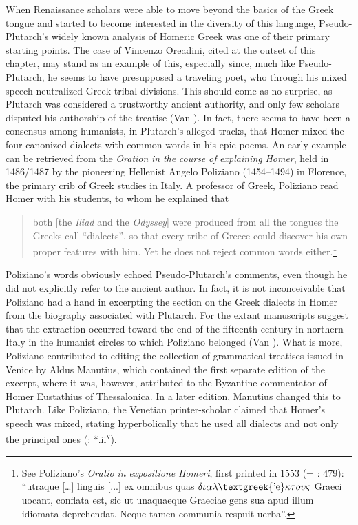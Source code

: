 \documentclass[output=paper]{langsci/langscibook}
\begin{document}
When Renaissance scholars were able to move beyond the basics of the Greek tongue and started to become interested in the diversity of this language, Pseudo-Plutarch’s widely known analysis of Homeric Greek was one of their primary starting points. The case of Vincenzo Oreadini, cited at the outset of this chapter, may stand as an example of this, especially since, much like Pseudo-Plutarch, he seems to have presupposed a traveling poet, who through his mixed speech neutralized Greek tribal divisions. This should come as no surprise, as Plutarch was considered a trustworthy ancient authority, and only few scholars disputed his authorship of the treatise (Van \citealt{Rooy2018c}). In fact, there seems to have been a consensus among humanists, in Plutarch’s alleged tracks, that Homer mixed the four canonized dialects with common words in his epic poems. An early example can be retrieved from the \textit{Oration} \textit{in} \textit{the} \textit{course} \textit{of} \textit{explaining} \textit{Homer}, held in 1486/1487 by the pioneering Hellenist Angelo Poliziano (1454–1494) in Florence, the primary crib of Greek studies in Italy. A professor of Greek, Poliziano read Homer with his students, to whom he explained that

\begin{quote}
both [the \textit{Iliad} and the \textit{Odyssey}] were produced from all the tongues the Greeks call “dialects”, so that every tribe of Greece could discover his own proper features with him. Yet he does not reject common words either.\footnote{See Poliziano’s \textit{Oratio} \textit{in} \textit{expositione} \textit{Homeri}, first printed in 1553 (= \citealt{Poliziano1553}: 479): “utraque […] linguis [...] ex omnibus quas $\delta \iota \alpha \lambda \text{\textgreek{'e}}\kappa \tau o\upsilon \varsigma $ Graeci uocant, conflata est, sic ut unaquaeque Graeciae gens sua apud illum idiomata deprehendat. Neque tamen communia respuit uerba”.}
\end{quote}

Poliziano’s words obviously echoed Pseudo-Plutarch’s comments, even though he did not explicitly refer to the ancient author. In fact, it is not inconceivable that Poliziano had a hand in excerpting the section on the Greek dialects in Homer from the biography associated with Plutarch. For the extant manuscripts suggest that the extraction occurred toward the end of the fifteenth century in northern Italy in the humanist circles to which Poliziano belonged (Van \citealt{Rooy2018c}). What is more, Poliziano contributed to editing the collection of grammatical treatises issued in Venice by Aldus Manutius, which contained the first separate edition of the excerpt, where it was, however, attributed to the Byzantine commentator of Homer Eustathius of Thessalonica. In a later edition, Manutius changed this to Plutarch. Like Poliziano, the Venetian printer-scholar claimed that Homer’s speech was mixed, stating hyperbolically that he used all dialects and not only the principal ones (\citealt{Manutius1496}: *.ii\textsc{\textsuperscript{v}}).
\end{document}
